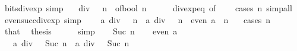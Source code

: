 \begin{isabellebody}
{\isafoldproof}%
%
\isadelimproof
\isanewline
%
\endisadelimproof
\isanewline
{}\isamarkupfalse%
\ bits{\isacharunderscore}{\kern0pt}{}{\isacharunderscore}{\kern0pt}div{\isacharunderscore}{\kern0pt}exp\ {\isacharbrackleft}{\kern0pt}simp{\isacharbrackright}{\kern0pt}{\isacharcolon}{\kern0pt}\isanewline
\ \ {\isacartoucheopen}{}\ div\ {}\ {\isacharcircum}{\kern0pt}\ n\ {\isacharequal}{\kern0pt}\ of{\isacharunderscore}{\kern0pt}bool\ {\isacharparenleft}{\kern0pt}n\ {\isacharequal}{\kern0pt}\ {}{\isacharparenright}{\kern0pt}{\isacartoucheclose}\isanewline
%
\isadelimproof
\ \ %
\endisadelimproof
%
\isatagproof
{}\isamarkupfalse%
\ div{\isacharunderscore}{\kern0pt}exp{\isacharunderscore}{\kern0pt}eq\ {\isacharbrackleft}{\kern0pt}of\ {}\ {}{\isacharbrackright}{\kern0pt}\ \isamarkupfalse%
\ {\isacharparenleft}{\kern0pt}cases\ n{\isacharparenright}{\kern0pt}\ simp{\isacharunderscore}{\kern0pt}all%
\endisatagproof
{\isafoldproof}%
%
\isadelimproof
\isanewline
%
\endisadelimproof
\isanewline
{}\isamarkupfalse%
\ even{\isacharunderscore}{\kern0pt}succ{\isacharunderscore}{\kern0pt}div{\isacharunderscore}{\kern0pt}exp\ {\isacharbrackleft}{\kern0pt}simp{\isacharbrackright}{\kern0pt}{\isacharcolon}{\kern0pt}\isanewline
\ \ {\isacartoucheopen}{\isacharparenleft}{\kern0pt}{}\ {\isacharplus}{\kern0pt}\ a{\isacharparenright}{\kern0pt}\ div\ {}\ {\isacharcircum}{\kern0pt}\ n\ {\isacharequal}{\kern0pt}\ a\ div\ {}\ {\isacharcircum}{\kern0pt}\ n{\isacartoucheclose}\ \ {\isacartoucheopen}even\ a{\isacartoucheclose}\ \ {\isacartoucheopen}n\ {\isachargreater}{\kern0pt}\ {}{\isacartoucheclose}\isanewline
%
\isadelimproof
%
\endisadelimproof
%
\isatagproof
{}\isamarkupfalse%
\ {\isacharparenleft}{\kern0pt}cases\ n{\isacharparenright}{\kern0pt}\isanewline
\ \ \isamarkupfalse%
\ {}\isanewline
\ \ \isamarkupfalse%
\ that\ \isamarkupfalse%
\ {\isacharquery}{\kern0pt}thesis\isanewline
\ \ \ \ \isamarkupfalse%
\ simp\isanewline
{}\isamarkupfalse%
\isanewline
\ \ \isamarkupfalse%
\ {\isacharparenleft}{\kern0pt}Suc\ n{\isacharparenright}{\kern0pt}\isanewline
\ \ \isamarkupfalse%
\ {\isacartoucheopen}even\ a{\isacartoucheclose}\ \isamarkupfalse%
\ {\isacartoucheopen}{\isacharparenleft}{\kern0pt}{}\ {\isacharplus}{\kern0pt}\ a{\isacharparenright}{\kern0pt}\ div\ {}\ {\isacharcircum}{\kern0pt}\ Suc\ n\ {\isacharequal}{\kern0pt}\ a\ div\ {}\ {\isacharcircum}{\kern0pt}\ Suc\ n{\isacartoucheclose}\isanewline

\end{isabellebody}

